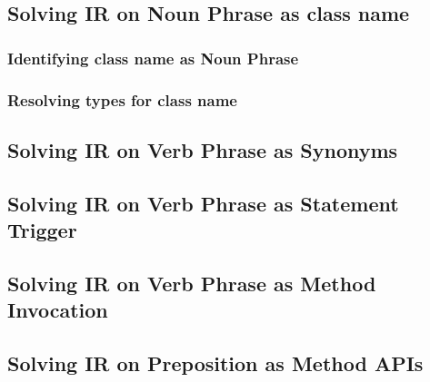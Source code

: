 \subsection{Solving IR on Noun Phrase as class name}
\subsubsection{Identifying  class name as Noun Phrase}
\subsubsection{Resolving types for  class name}
\subsection{Solving IR on Verb Phrase as Synonyms}
\subsection{Solving IR on Verb Phrase as Statement Trigger}
\subsection{Solving IR on Verb Phrase as Method Invocation}
\subsection{Solving IR on Preposition as Method APIs}



